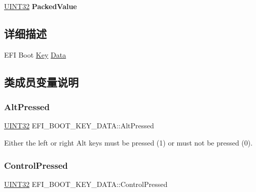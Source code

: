 \begin{DoxyCompactItemize}
\begin{tabbing}
\end{tabbing}\item 
\mbox{\label{union_e_f_i___b_o_o_t___k_e_y___d_a_t_a_acf7d152913562b4398601bf632189bb6}} 
\hyperlink{_processor_bind_8h_ae1e6edbbc26d6fbc71a90190d0266018}{U\+I\+N\+T32} {\bfseries Packed\+Value}
\end{DoxyCompactItemize}


\subsection{详细描述}
E\+FI Boot \hyperlink{struct_key}{Key} \hyperlink{struct_data}{Data} 

\subsection{类成员变量说明}
\mbox{\label{union_e_f_i___b_o_o_t___k_e_y___d_a_t_a_aa82e45e248810ec394eab8d7e6269124}} 
\subsubsection{\texorpdfstring{Alt\+Pressed}{AltPressed}}
{\footnotesize\ttfamily \hyperlink{_processor_bind_8h_ae1e6edbbc26d6fbc71a90190d0266018}{U\+I\+N\+T32} E\+F\+I\+\_\+\+B\+O\+O\+T\+\_\+\+K\+E\+Y\+\_\+\+D\+A\+T\+A\+::\+Alt\+Pressed}

Either the left or right Alt keys must be pressed (1) or must not be pressed (0). \mbox{\label{union_e_f_i___b_o_o_t___k_e_y___d_a_t_a_a03fb2a51be42ee8e4595839614cad882}} 
\subsubsection{\texorpdfstring{Control\+Pressed}{ControlPressed}}
{\footnotesize\ttfamily \hyperlink{_processor_bind_8h_ae1e6edbbc26d6fbc71a90190d0266018}{U\+I\+N\+T32} E\+F\+I\+\_\+\+B\+O\+O\+T\+\_\+\+K\+E\+Y\+\_\+\+D\+A\+T\+A\+::\+Control\+Pressed}

